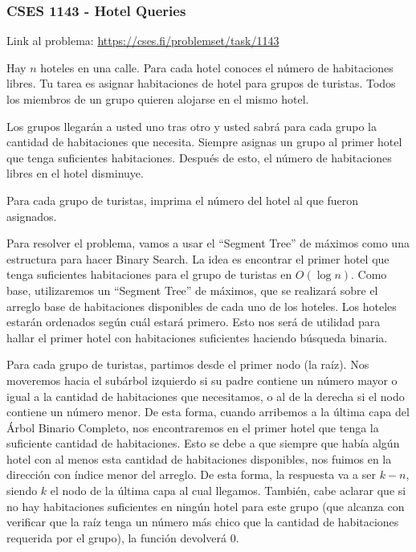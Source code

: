 \documentclass{article}
\begin{document}
\subsubsection{CSES 1143 - Hotel Queries}

Link al problema: \href{https://cses.fi/problemset/task/1143}{https://cses.fi/problemset/task/1143}
\begin{tcolorbox}
Hay $n$ hoteles en una calle. Para cada hotel conoces el número de habitaciones libres. Tu tarea es asignar habitaciones de hotel para grupos de turistas. Todos los miembros de un grupo quieren alojarse en el mismo hotel.

Los grupos llegarán a usted uno tras otro y usted sabrá para cada grupo la cantidad de habitaciones que necesita. Siempre asignas un grupo al primer hotel que tenga suficientes habitaciones. Después de esto, el número de habitaciones libres en el hotel disminuye.

Para cada grupo de turistas, imprima el número del hotel al que fueron asignados.
\end{tcolorbox}

Para resolver el problema, vamos a usar el ``Segment Tree''  de máximos como una estructura para hacer Binary Search. La idea es encontrar el primer hotel que tenga suficientes habitaciones para el grupo de turistas en $O(\log n)$. Como base, utilizaremos un ``Segment Tree'' de máximos, que se realizará sobre el arreglo base de habitaciones disponibles de cada uno de los hoteles. Los hoteles estarán ordenados según cuál estará primero. Esto nos será de utilidad para hallar el primer hotel con habitaciones suficientes haciendo búsqueda binaria.

Para cada grupo de turistas, partimos desde el primer nodo (la raíz). Nos moveremos hacia el subárbol izquierdo si su padre contiene un número mayor o igual a la cantidad de habitaciones que necesitamos, o al de la derecha si el nodo contiene un número menor. De esta forma, cuando arribemos a la última capa del Árbol Binario Completo, nos encontraremos en el primer hotel que tenga la suficiente cantidad de habitaciones. Esto se debe a que siempre que había algún hotel con al menos esta cantidad de habitaciones disponibles, nos fuimos en la dirección con índice menor del arreglo. De esta forma, la respuesta va a ser $k-n$, siendo $k$ el nodo de la última capa al cual llegamos. También, cabe aclarar que si no hay habitaciones suficientes en ningún hotel para este grupo (que alcanza con verificar que la raíz tenga un número más chico que la cantidad de habitaciones requerida por el grupo), la función devolverá $0$.
\end{document}
